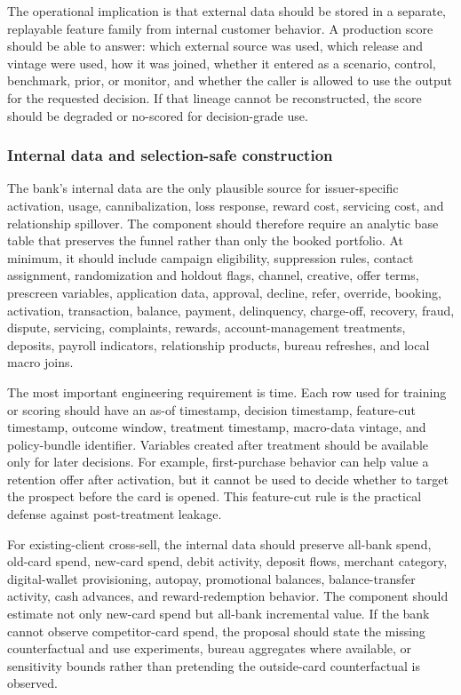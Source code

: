 \documentclass[11pt]{article}
\newcommand{\1}{\mathbf{1}}
\begin{document}
The operational implication is that external data should be stored in a
separate, replayable feature family from internal customer behavior. A
production score should be able to answer: which external source was used,
which release and vintage were used, how it was joined, whether it entered as
a scenario, control, benchmark, prior, or monitor, and whether the caller is
allowed to use the output for the requested decision. If that lineage cannot
be reconstructed, the score should be degraded or no-scored for decision-grade
use.

\subsubsection{Internal data and selection-safe construction}

The bank's internal data are the only plausible source for issuer-specific
activation, usage, cannibalization, loss response, reward cost, servicing cost,
and relationship spillover. The component should therefore require an analytic
base table that preserves the funnel rather than only the booked portfolio. At
minimum, it should include campaign eligibility, suppression rules, contact
assignment, randomization and holdout flags, channel, creative, offer terms,
prescreen variables, application data, approval, decline, refer, override,
booking, activation, transaction, balance, payment, delinquency, charge-off,
recovery, fraud, dispute, servicing, complaints, rewards, account-management
treatments, deposits, payroll indicators, relationship products, bureau
refreshes, and local macro joins.

The most important engineering requirement is time. Each row used for
training or scoring should have an as-of timestamp, decision timestamp,
feature-cut timestamp, outcome window, treatment timestamp, macro-data vintage,
and policy-bundle identifier. Variables created after treatment should be
available only for later decisions. For example, first-purchase behavior can
help value a retention offer after activation, but it cannot be used to decide
whether to target the prospect before the card is opened. This feature-cut rule
is the practical defense against post-treatment leakage.

For existing-client cross-sell, the internal data should preserve all-bank
spend, old-card spend, new-card spend, debit activity, deposit flows, merchant
category, digital-wallet provisioning, autopay, promotional balances,
balance-transfer activity, cash advances, and reward-redemption behavior. The
component should estimate not only new-card spend but all-bank incremental
value. If the bank cannot observe competitor-card spend, the proposal should
state the missing counterfactual and use experiments, bureau aggregates where
available, or sensitivity bounds rather than pretending the outside-card
counterfactual is observed.
\end{document}
